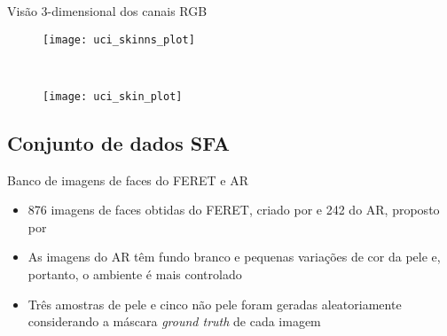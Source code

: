 \begin{frame}{Visão 3-dimensional dos canais RGB}
\begin{figure}[h]
    \centering
    \begin{minipage}{0.45\textwidth}
        \texttt{[image: uci\_skinns\_plot]}
    \end{minipage}
    ~ %
    \begin{minipage}{0.45\textwidth}
        \texttt{[image: uci\_skin\_plot]}
    \end{minipage}
    \label{fig:dataset_uci}
\end{figure}
\end{frame}

\subsection{Conjunto de dados SFA}
\begin{frame}{Banco de imagens de faces do FERET e AR}
  \begin{itemize}
      \item 876 imagens de faces obtidas do FERET, criado por \citet{feret:96} e 242 do AR, proposto por \citet{ar-face-database:98}
      
      \item As imagens do AR têm fundo branco e pequenas variações de cor da pele e, portanto, o ambiente é mais controlado
      
      \item Três amostras de pele e cinco não pele foram geradas aleatoriamente considerando a máscara \emph{ground truth} de cada imagem
  \end{itemize}
\end{frame}

